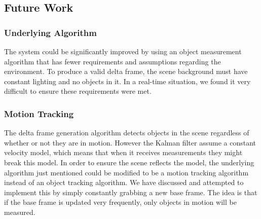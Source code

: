 \documentclass[11pt]{article} %
\begin{document}
\subsection{Future Work}
\subsubsection{Underlying Algorithm}
The system could be significantly improved by using an object measurement algorithm that has fewer requirements and assumptions regarding the environment. To produce a valid delta frame, the scene background must have constant lighting and no objects in it. In a real-time situation, we found it very difficult to ensure these requirements were met. 
\subsubsection{Motion Tracking}
The delta frame generation algorithm detects objects in the scene regardless of whether or not they are in motion. However the Kalman filter assume a constant velocity model, which means that when it receives measurements they might break this model. In order to ensure the scene reflects the model, the underlying algorithm just mentioned could be modified to be a motion tracking algorithm instead of an object tracking algorithm. We have discussed and attempted to implement this by simply constantly grabbing a new base frame. The idea is that if the base frame is updated very frequently, only objects in motion will be measured.
\end{document}

